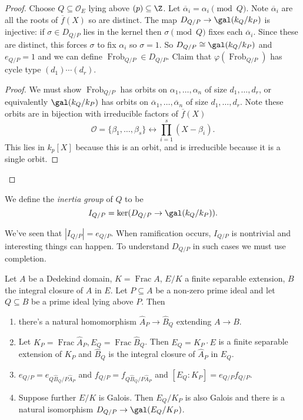 \documentclass[a4paper]{article}
\DeclareMathOperator{\Frac}{Frac}
\renewcommand*{\O}{\mathcal{O}}
\DeclareMathOperator{\Frob}{Frob} %
\begin{document}
\begin{proof}
  Choose \(Q \subseteq \O_E\) lying above \((p) \subseteq \Z\). Let \(\overline \alpha_i = \alpha_i \pmod Q\). Note \(\overline \alpha_i\) are all the roots of \(\overline f(X)\) so are distinct. The map \(D_{Q/P} \to \gal(k_Q/k_P)\) is injective: if \(\sigma \in D_{Q/P}\) lies in the kernel then \(\sigma \pmod Q\) fixes each \(\overline \alpha_i\). Since these are distinct, this forces \(\sigma\) to fix \(\alpha_i\) so \(\sigma = 1\). So \(D_{Q/P} \cong \gal(k_Q/k_P)\) and \(e_{Q/P} = 1\) and we can define \(\Frob_{Q/P} \in D_{Q/P}\). Claim that \(\varphi(\Frob_{Q/P})\) has cycle type \((d_1) \cdots (d_r)\).

  \begin{proof}
    We must show \(\Frob_{Q/P}\) has orbits on \(\alpha_1, \dots, \alpha_n\) of size \(d_1, \dots, d_r\), or equivalently \(\gal(k_Q/k_P)\) has orbits on \(\overline \alpha_1, \dots, \overline \alpha_n\) of size \(d_1, \dots, d_r\). Note these orbits are in bijection with irreducible factors of \(\overline f(X)\)
    \[
      \O = \{\beta_1, \dots, \beta_s\} \longleftrightarrow \prod_{i = 1}^s(X - \beta_i).
    \]
    This lies in \(k_p[X]\) because this is an orbit, and is irreducible because it is a single orbit.
  \end{proof}
\end{proof}

\begin{definition}
  We define the \emph{inertia group} of \(Q\) to be
  \[
    I_{Q/P} = \ker (D_{Q/P} \to \gal(k_Q/k_P)).
  \]
\end{definition}

We've seen that \(|I_{Q/P}| = e_{Q/P}\). When ramification occurs, \(I_{Q/P}\) is nontrivial and interesting things can happen. To understand \(D_{Q/P}\) in such cases we must use completion.

\begin{proposition}
  Let \(A\) be a Dedekind domain, \(K = \Frac A\), \(E/K\) a finite separable extension, \(B\) the integral closure of \(A\) in \(E\). Let \(P \subseteq A\) be a non-zero prime ideal and let \(Q \subseteq B\) be a prime ideal lying above \(P\). Then
  \begin{enumerate}
  \item there's a natural homomorphism \(\hat A_P \to \hat B_Q\) extending \(A \to B\).
  \item Let \(K_P = \Frac \hat A_P, E_Q = \Frac \hat B_Q\). Then \(E_Q = K_P \cdot E\) is a finite separable extension of \(K_P\) and \(\hat B_Q\) is the integral closure of \(\hat A_P\) in \(E_Q\).
  \item \(e_{Q/P} = e_{Q \hat B_Q/P \hat A_P}\) and \(f_{Q/P} = f_{Q \hat B_Q/P \hat A_P}\) and \([E_Q: K_P] = e_{Q/P} f_{Q/P}\).
  \item Suppose further \(E/K\) is Galois. Then \(E_Q/K_P\) is also Galois and there is a natural isomorphism \(D_{Q/P} \to \gal(E_Q/K_P)\).
  \end{enumerate}
\end{proposition}
\end{document}
